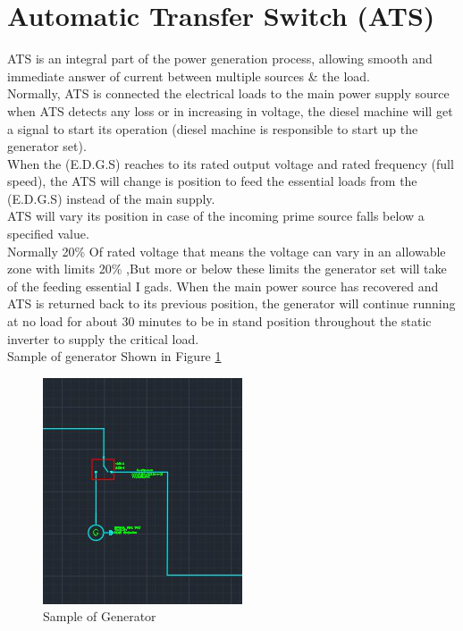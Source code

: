 \documentclass[12pt,fleqn]{book} %
\begin{document}
\section{Automatic Transfer Switch (ATS)}
ATS is an integral part of the power generation process, allowing smooth and immediate answer of current between multiple sources & the load.\\
Normally, ATS is connected the electrical loads to the main power supply source when ATS detects any loss or in increasing in voltage, the diesel machine will get a signal to start its operation (diesel machine is responsible to start up the generator set).\\
When the (E.D.G.S) reaches to its rated output voltage and rated frequency (full speed), the ATS will change is position to feed the essential loads from the (E.D.G.S) instead of the main supply.\\
ATS will vary its position in case of the incoming prime source falls below a specified value.\\
Normally 20\% Of rated voltage that means the voltage can vary in an allowable zone with limits 20\% ,But more or below these limits the generator set will take of the feeding essential I gads. When the main power source has recovered and ATS is returned back to its previous position, the generator will continue running at no load for about 30 minutes to be in stand position throughout the static inverter to supply the critical load.\\
Sample of generator Shown in Figure \ref{fig:hamdy 15}
\begin{figure}[!h]
    \centering
    \includegraphics[width=0.5\linewidth]{hamdy 15.png}
    \caption{Sample of Generator}
    \label{fig:hamdy 15}
\end{figure} 
\end{document}
